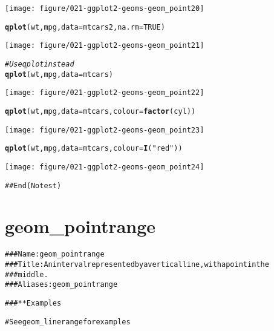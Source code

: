 \documentclass[a4paper,titlepage]{tufte-handout}\usepackage[]{graphicx}\usepackage[]{color}
\makeatletter
\def\maxwidth{ %
  \ifdim\Gin@nat@width>\linewidth
    \linewidth
  \else
    \Gin@nat@width
  \fi
}
\newcommand{\hlnum}[1]{\textcolor[rgb]{0.686,0.059,0.569}{#1}}%
\newcommand{\hlstr}[1]{\textcolor[rgb]{0.192,0.494,0.8}{#1}}%
\newcommand{\hlcom}[1]{\textcolor[rgb]{0.678,0.584,0.686}{\textit{#1}}}%
\newcommand{\hlstd}[1]{\textcolor[rgb]{0.345,0.345,0.345}{#1}}%
\newcommand{\hlkwc}[1]{\textcolor[rgb]{0.333,0.667,0.333}{#1}}%
\newcommand{\hlkwd}[1]{\textcolor[rgb]{0.737,0.353,0.396}{\textbf{#1}}}%
\newenvironment{kframe}{%
 \def\at@end@of@kframe{}%
 \ifinner\ifhmode%
  \def\at@end@of@kframe{\end{minipage}}%
  \begin{minipage}{\columnwidth}%
 \fi\fi%
 \def\FrameCommand##1{\hskip\@totalleftmargin \hskip-\fboxsep
 \colorbox{shadecolor}{##1}\hskip-\fboxsep
     \hskip-\linewidth \hskip-\@totalleftmargin \hskip\columnwidth}%
 \MakeFramed {\advance\hsize-\width
   \@totalleftmargin\z@ \linewidth\hsize
   \@setminipage}}%
 {\par\unskip\endMakeFramed%
 \at@end@of@kframe}
\newenvironment{knitrout}{}{} %
\makeatother
\begin{document}
\begin{knitrout}
\begin{kframe}
{\ttfamily\noindent\color{warningcolor}{\#\# Warning: Removed 11 rows containing missing values (geom\_point).}}\end{kframe}
\texttt{[image: figure/021-ggplot2-geoms-geom\_point20]} 
\begin{kframe}\begin{alltt}
\hlkwd{qplot}\hlstd{(wt, mpg,} \hlkwc{data} \hlstd{= mtcars2,} \hlkwc{na.rm} \hlstd{=} \hlnum{TRUE}\hlstd{)}
\end{alltt}
\end{kframe}
\texttt{[image: figure/021-ggplot2-geoms-geom\_point21]} 
\begin{kframe}\begin{alltt}
\hlcom{# Use qplot instead}
\hlkwd{qplot}\hlstd{(wt, mpg,} \hlkwc{data} \hlstd{= mtcars)}
\end{alltt}
\end{kframe}
\texttt{[image: figure/021-ggplot2-geoms-geom\_point22]} 
\begin{kframe}\begin{alltt}
\hlkwd{qplot}\hlstd{(wt, mpg,} \hlkwc{data} \hlstd{= mtcars,} \hlkwc{colour} \hlstd{=} \hlkwd{factor}\hlstd{(cyl))}
\end{alltt}
\end{kframe}
\texttt{[image: figure/021-ggplot2-geoms-geom\_point23]} 
\begin{kframe}\begin{alltt}
\hlkwd{qplot}\hlstd{(wt, mpg,} \hlkwc{data} \hlstd{= mtcars,} \hlkwc{colour} \hlstd{=} \hlkwd{I}\hlstd{(}\hlstr{"red"}\hlstd{))}
\end{alltt}
\end{kframe}
\texttt{[image: figure/021-ggplot2-geoms-geom\_point24]} 
\begin{kframe}\begin{alltt}
## End(No test)


\end{alltt}
\end{kframe}
\end{knitrout}



\section{geom\_pointrange}

\begin{knitrout}
\color{fgcolor}\begin{kframe}
\begin{alltt}
### Name: geom_pointrange
### Title: An interval represented by a vertical line, with a point in the
###   middle.
### Aliases: geom_pointrange

### ** Examples

# See geom_linerange for examples



\end{alltt}
\end{kframe}
\end{knitrout}
\end{document}
